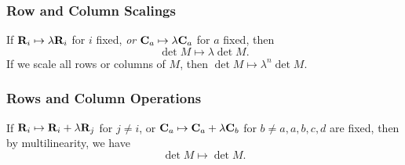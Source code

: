 \documentclass[10pt]{article}
\begin{document}
    \subsubsection{Row and Column Scalings}
    If $ {\bf R}_i \mapsto \lambda{\bf R}_i $ for $i$ fixed, \textit{or} $ {\bf C}_a\mapsto \lambda{\bf C}_a $ for $a$ fixed, then 
    \[
        \det M \mapsto \lambda \det M
    .\]
    If we scale all rows or columns of $M$, then $ \det M \mapsto \lambda^n \det M  $.
    \subsubsection{Rows and Column Operations}
    If $ {\bf R}_i\mapsto{\bf R}_i+\lambda{\bf R}_j $ for $j\neq i$, or $ {\bf C}_a\mapsto{\bf C}_a+\lambda{\bf C}_b $ for $ b\neq a, a,b,c,d $ are fixed, then by multilinearity, we have 
    \[
        \det M \mapsto \det M
    .\]
\end{document}
